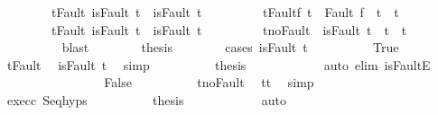 \begin{isabellebody}
\ \ \ \ \ \ \ \ t{\isacharunderscore}Fault{\isacharcolon}\ {\isachardoublequoteopen}isFault\ t\ {\isasymlongrightarrow}\ isFault\ t{\isacharprime}{\isachardoublequoteclose}\ \isanewline
\ \ \ \ \ \ \ \ t{\isacharprime}{\isacharunderscore}Fault{\isacharunderscore}f{\isacharcolon}\ {\isachardoublequoteopen}t{\isacharprime}\ {\isacharequal}\ Fault\ f\ {\isasymlongrightarrow}\ t{\isacharprime}\ {\isacharequal}\ t{\isachardoublequoteclose}\ \isanewline
\ \ \ \ \ \ \ \ t{\isacharprime}{\isacharunderscore}Fault{\isacharcolon}\ {\isachardoublequoteopen}isFault\ t{\isacharprime}\ {\isasymlongrightarrow}\ isFault\ t{\isachardoublequoteclose}\ \isanewline
\ \ \ \ \ \ \ \ t{\isacharprime}{\isacharunderscore}noFault{\isacharcolon}\ {\isachardoublequoteopen}{\isasymnot}\ isFault\ t{\isacharprime}\ {\isasymlongrightarrow}\ t{\isacharprime}\ {\isacharequal}\ t{\isachardoublequoteclose}\isanewline
\ \ \ \ \ \ \ \ \isamarkupfalse%
\ blast\isanewline
\ \ \ \ \ \ \isamarkupfalse%
\ {\isacharquery}thesis\isanewline
\ \ \ \ \ \ \isamarkupfalse%
\ {\isacharparenleft}cases\ {\isachardoublequoteopen}isFault\ t{\isacharprime}{\isachardoublequoteclose}{\isacharparenright}\isanewline
\ \ \ \ \ \ \ \ \isamarkupfalse%
\ True\isanewline
\ \ \ \ \ \ \ \ \isamarkupfalse%
\ t{\isacharprime}{\isacharunderscore}Fault\ \isamarkupfalse%
\ {\isachardoublequoteopen}isFault\ t{\isachardoublequoteclose}\ \isamarkupfalse%
\ simp\isanewline
\ \ \ \ \ \ \ \ \isamarkupfalse%
\ {\isacharquery}thesis\isanewline
\ \ \ \ \ \ \ \ \ \ \isamarkupfalse%
\ {\isacharparenleft}auto\ elim{\isacharcolon}\ isFaultE{\isacharparenright}\isanewline
\ \ \ \ \ \ \isamarkupfalse%
\isanewline
\ \ \ \ \ \ \ \ \isamarkupfalse%
\ False\isanewline
\ \ \ \ \ \ \ \ \isamarkupfalse%
\ t{\isacharprime}{\isacharunderscore}noFault\ \isamarkupfalse%
\ {\isachardoublequoteopen}t{\isacharprime}{\isacharequal}t{\isachardoublequoteclose}\ \isamarkupfalse%
\ simp\isanewline
\ \ \ \ \ \ \ \ \isamarkupfalse%
\ exec{\isacharunderscore}c{}\ Seq{\isachardot}hyps\isanewline
\ \ \ \ \ \ \ \ \isamarkupfalse%
\ {\isacharquery}thesis\isanewline
\ \ \ \ \ \ \ \ \ \ \isamarkupfalse%
\ auto\isanewline
\ \ \ \ \ \ \isamarkupfalse%
\isanewline
\ \ \ \ \isamarkupfalse%
\ \ \isanewline
\ \ \isacommand{{\isacharbraceright}}\isamarkupfalse%

\end{isabellebody}
